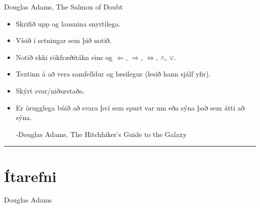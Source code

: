 \documentclass[a4paper,10pt,icelandic]{sphinxmanual}
\begin{document}
\textendash{} Douglas Adams, The Salmon of Doubt
\begin{itemize}
\item {} 
Skrifið upp  og lausnina snyrtilega.

\item {} 
Vísið í setningar sem þið notið.

\item {} 
Notið ekki rökfræðitákn eins og \(\Leftarrow\),
\(\Rightarrow\), \(\Leftrightarrow\), \(\wedge\),
\(\vee\).

\item {} 
Textinn á að vera samfelldur og læsilegur (lesið hann sjálf yfir).

\item {} 
Skýrt svar/niðurstaða.

\item {} 
Er örugglega búið að svara því sem spurt var um eða sýna það sem átti að sýna.



-Douglas Adams, The Hitchhiker’s Guide to the Galaxy

\end{itemize}


\bigskip\hrule\bigskip


\newpage


\section{Ítarefni}
\label{\detokenize{vidauki:itarefni}}

\textendash{} Douglas Adams
\end{document}
